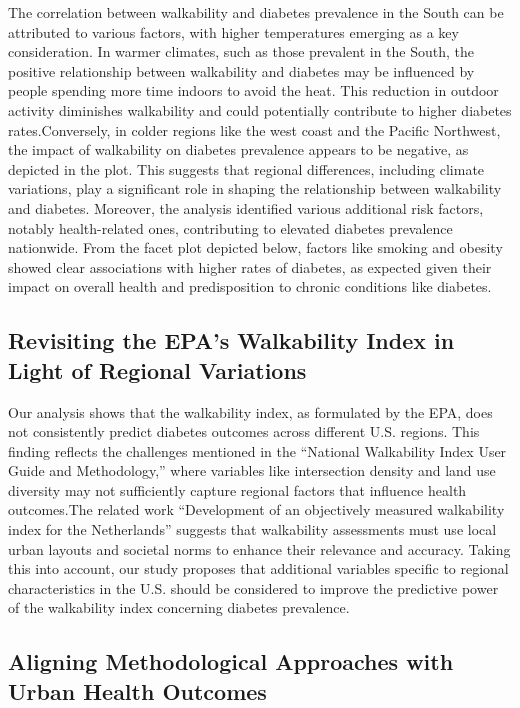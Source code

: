 \documentclass[
]{article}
\begin{document}
The correlation between walkability and diabetes prevalence in the South
can be attributed to various factors, with higher temperatures emerging
as a key consideration. In warmer climates, such as those prevalent in
the South, the positive relationship between walkability and diabetes
may be influenced by people spending more time indoors to avoid the
heat. This reduction in outdoor activity diminishes walkability and
could potentially contribute to higher diabetes rates.Conversely, in
colder regions like the west coast and the Pacific Northwest, the impact
of walkability on diabetes prevalence appears to be negative, as
depicted in the plot. This suggests that regional differences, including
climate variations, play a significant role in shaping the relationship
between walkability and diabetes. Moreover, the analysis identified
various additional risk factors, notably health-related ones,
contributing to elevated diabetes prevalence nationwide. From the facet
plot depicted below, factors like smoking and obesity showed clear
associations with higher rates of diabetes, as expected given their
impact on overall health and predisposition to chronic conditions like
diabetes.

\subsection{Revisiting the EPA's Walkability Index in Light of Regional
Variations}\label{revisiting-the-epas-walkability-index-in-light-of-regional-variations}

Our analysis shows that the walkability index, as formulated by the EPA,
does not consistently predict diabetes outcomes across different U.S.
regions. This finding reflects the challenges mentioned in the
``National Walkability Index User Guide and Methodology,'' where
variables like intersection density and land use diversity may not
sufficiently capture regional factors that influence health outcomes.The
related work ``Development of an objectively measured walkability index
for the Netherlands'' suggests that walkability assessments must use
local urban layouts and societal norms to enhance their relevance and
accuracy. Taking this into account, our study proposes that additional
variables specific to regional characteristics in the U.S. should be
considered to improve the predictive power of the walkability index
concerning diabetes prevalence.

\subsection{Aligning Methodological Approaches with Urban Health
Outcomes}\label{aligning-methodological-approaches-with-urban-health-outcomes}
\end{document}
